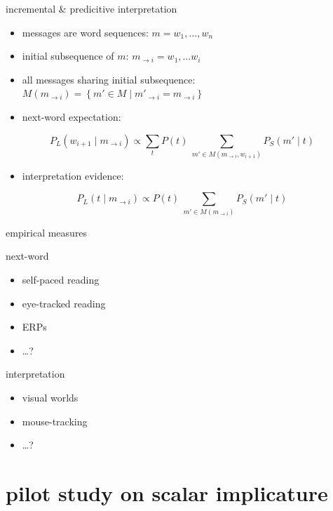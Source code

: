 \documentclass[ignorenonframetext,]{beamer}
\providecommand{\tightlist}{%
\setlength{\itemsep}{0pt}\setlength{\parskip}{0pt}}
\newcommand{\state}{\ensuremath{t}\xspace}		%
\newcommand{\Messgs}{\ensuremath{M}\xspace}		%
\newcommand{\messg}{\ensuremath{m}\xspace}		%
\newcommand{\set}[1]{\left\{#1\right\}}
\begin{document}
\begin{frame}{incremental \& predicitive interpretation}

\begin{itemize}
\item
  messages are word sequences: \(\messg = w_1, \dots, w_n\)
\item
  initial subsequence of \(\messg\):
  \(\messg_{\rightarrow i} = w_1, \dots w_i\)
\item
  all messages sharing initial subsequence:
  \(\Messgs(\messg_{\rightarrow i}) = \set{\messg' \in \Messgs \mid \messg'_{\rightarrow i} =  \messg_{\rightarrow i}}\)
\item
  {next-word expectation}:
\end{itemize}

\[P_L(w_{i+1} \mid \messg_{\rightarrow i}) \propto \sum_{\state} P(\state) \ \sum_{\messg' \in
    \Messgs(\messg_{\rightarrow i}, w_{i+1})} P_S(\messg' \mid \state)\]

\begin{itemize}
\tightlist
\item
  {interpretation evidence}:
\end{itemize}

\[P_L(\state \mid \messg_{\rightarrow i}) \propto P(\state) \ \sum_{\messg' \in
    \Messgs(\messg_{\rightarrow i})} P_S(\messg' \mid \state)\]

\end{frame}

\begin{frame}{empirical measures}

{next-word}

\begin{itemize}
\item
  self-paced reading
\item
  eye-tracked reading
\item
  ERPs
\item
  \ldots{}?
\end{itemize}

{interpretation}

\begin{itemize}
\item
  visual worlds
\item
  mouse-tracking
\item
  \ldots{}?
\end{itemize}

\end{frame}

\section{pilot study on scalar
implicature}\label{pilot-study-on-scalar-implicature}
\end{document}
